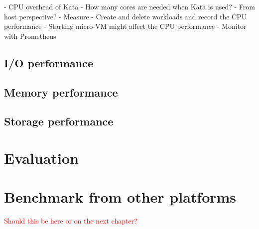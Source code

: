 - CPU overhead of Kata
	- How many cores are needed when Kata is used?
	- From host perspective?
	- Measure
		- Create and delete workloads and record the CPU performance
			- Starting micro-VM might affect the CPU performance
			- Monitor with Prometheus

\subsection{I/O performance}

\subsection{Memory performance}

\subsection{Storage performance}

\section{Evaluation}

\section{Benchmark from other platforms}

\textcolor{red}{Should this be here or on the next chapter?}